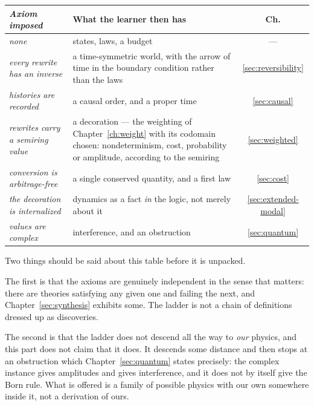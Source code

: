 \begin{center}
\renewcommand{\arraystretch}{1.3}
\begin{tabular}{>{\itshape}p{4.4cm} p{5.4cm} c}
\toprule
\normalfont\textbf{Axiom imposed} & \textbf{What the learner then has} & \textbf{Ch.} \\
\midrule
none
  & states, laws, a budget
  & --- \\
every rewrite has an inverse
  & a time-symmetric world, with the arrow of time in the boundary
    condition rather than the laws
  & \ref{sec:reversibility} \\
histories are recorded
  & a causal order, and a proper time
  & \ref{sec:causal} \\
rewrites carry a semiring value
  & a decoration --- the weighting of Chapter~\ref{ch:weight} with its
    codomain chosen: nondeterminism, cost, probability or amplitude,
    according to the semiring
  & \ref{sec:weighted} \\
conversion is arbitrage-free
  & a single conserved quantity, and a first law
  & \ref{sec:cost} \\
the decoration is internalized
  & dynamics as a fact \emph{in} the logic, not merely about it
  & \ref{sec:extended-modal} \\
values are complex
  & interference, and an obstruction
  & \ref{sec:quantum} \\
\bottomrule
\end{tabular}
\end{center}

Two things should be said about this table before it is unpacked.

The first is that the axioms are genuinely independent in the sense that
matters: there are theories satisfying any given one and failing the
next, and Chapter~\ref{sec:synthesis} exhibits some.
The ladder is not a chain of definitions dressed up as discoveries.

The second is that the ladder does not descend all the way to
\emph{our} physics, and this part does not claim that it does.
It descends some distance and then stops at an obstruction which
Chapter~\ref{sec:quantum} states precisely: the complex instance gives
amplitudes and gives interference, and it does not by itself give the
Born rule.
What is offered is a family of possible physics with our own somewhere
inside it, not a derivation of ours.

